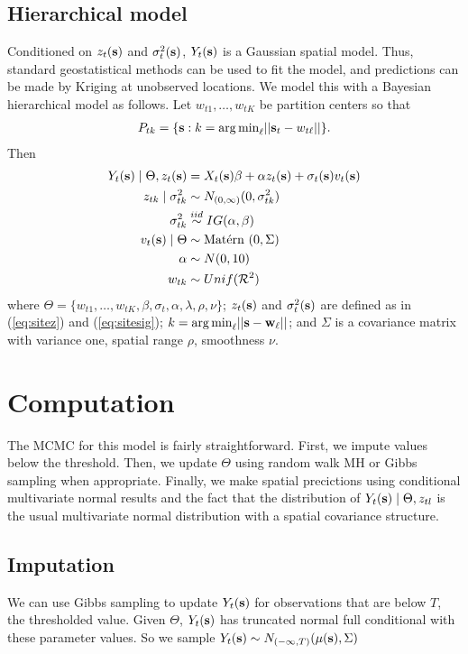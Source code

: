 \documentclass[11pt]{article}
\begin{document}
\subsection{Hierarchical model}\label{s:hier}
Conditioned on $z_t(\mbox{\bf s})$ and $\sigma^2_t(\mbox{\bf s})$, $Y_t(\mbox{\bf s})$ is a Gaussian spatial model.
Thus, standard geostatistical methods can be used to fit the model, and predictions can be made by Kriging at unobserved locations.
We model this with a Bayesian hierarchical model as follows.
Let $w_{t1}, \ldots, w_{tK}$ be partition centers so that
\begin{align*}
 P_{tk} = \{\mbox{\bf s} : k = {\mathop{\rm arg\, min}}_\ell || \mbox{\bf s}_t - w_{t\ell} ||\}.
\end{align*}
Then
\begin{align}
   Y_t(\mbox{\bf s}) \mid \Theta, z_{t}(\mbox{\bf s}) &= X_t(\mbox{\bf s}) \beta + \alpha z_t(\mbox{\bf s}) + \sigma
   _t(\mbox{\bf s}) v_t(\mbox{\bf s}) \label{eq:hier}\\
   z_{tk} \mid \sigma^2_{tk} &\sim N_{(0, \infty)}(0, \sigma^2_{tk})\\
   \sigma^2_{tk} &\stackrel{iid}{\sim} IG(\alpha, \beta)\\
   v_t(\mbox{\bf s}) \mid \Theta &\sim \mbox{Mat$\acute{\mbox{e}}$rn }(0, \Sigma)\\
   \alpha &\sim N(0, 10)\\
   w_{tk} &\sim Unif({\cal R}^2)
\end{align}
where $\Theta = \{w_{t1}, \ldots, w_{tK}, \beta, \sigma_t, \alpha, \lambda, \rho, \nu \}$; $z_t(\mbox{\bf s})$ and $\sigma^2_t(\mbox{\bf s})$ are defined as in (\ref{eq:sitez}) and (\ref{eq:sitesig}); \mbox{$k = {\mathop{\rm arg\, min}}_\ell ||\mbox{\bf s} - \mbox{\bf w}_\ell ||$}; and $\Sigma$ is a \Matern covariance matrix with variance one, spatial range $\rho$, smoothness $\nu$.

\section{Computation}\label{s:comp}
The MCMC for this model is fairly straightforward.
First, we impute values below the threshold.
Then, we update $\Theta$ using random walk MH or Gibbs sampling when appropriate.
Finally, we make spatial precictions using conditional multivariate normal results and the fact that the distribution of $Y_t(\mbox{\bf s}) \mid \Theta, z_{tl}$ is the usual multivariate normal distribution with a \Matern spatial covariance structure.

\subsection{Imputation}\label{s:impute}
We can use Gibbs sampling to update $Y_t(\mbox{\bf s})$ for observations that are below $T$, the thresholded value. Given $\Theta$, $Y_t(\mbox{\bf s})$ has truncated normal full conditional with these parameter values.
So we sample $Y_t(\mbox{\bf s}) \sim N_{(-\infty, T)}(\mu(\mbox{\bf s}), \Sigma)$
\end{document}
